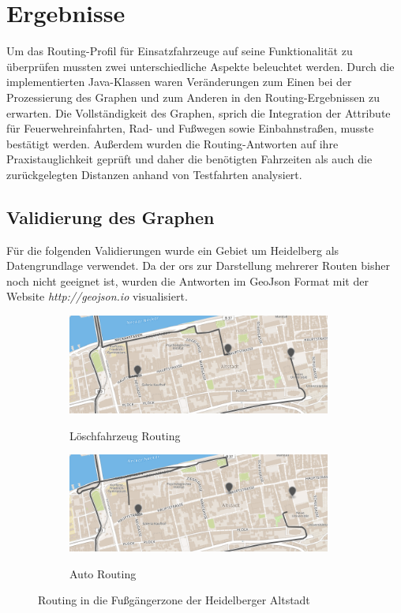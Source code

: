 \section{Ergebnisse}

Um das Routing-Profil für Einsatzfahrzeuge auf seine Funktionalität zu überprüfen mussten zwei unterschiedliche Aspekte beleuchtet werden.
Durch die implementierten Java-Klassen waren Veränderungen zum Einen bei der Prozessierung des Graphen und zum Anderen in den Routing-Ergebnissen zu erwarten.
Die Vollständigkeit des Graphen, sprich die Integration der Attribute für Feuerwehreinfahrten, Rad- und Fußwegen sowie Einbahnstraßen, musste bestätigt werden.
Außerdem wurden die Routing-Antworten auf ihre Praxistauglichkeit geprüft und daher die benötigten Fahrzeiten als auch die zurückgelegten Distanzen anhand von Testfahrten analysiert.


\subsection{Validierung des Graphen}

Für die folgenden Validierungen wurde ein Gebiet um Heidelberg als Datengrundlage verwendet.
Da der \gls{ors} zur Darstellung mehrerer Routen bisher noch nicht geeignet ist, wurden die Antworten im GeoJson Format mit der Website \textit{http://geojson.io} visualisiert.

\begin{figure}[htb]
\centering
\begin{subfigure}{0.49\textwidth}
\centering
\includegraphics[width = 0.95\textwidth]{../media/Altstadt_emergency.png} \\
\caption{Löschfahrzeug Routing}
\label{fig:alteme}
\end{subfigure}
\begin{subfigure}{0.49\textwidth}
\centering
\includegraphics[width = 0.95\textwidth]{../media/Altstadt_car.png} \\
\caption{Auto Routing}
\label{fig:altcar}
\end{subfigure}
\caption{Routing in die Fußgängerzone der Heidelberger Altstadt}
\label{fig:footway}
\end{figure}

